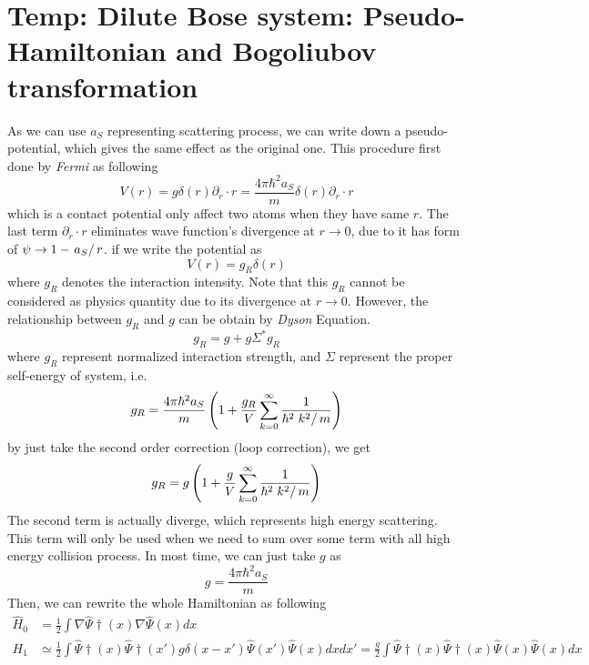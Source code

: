 \section{Temp: Dilute Bose system: Pseudo-Hamiltonian and Bogoliubov transformation}
As we can use $a_S$ representing scattering process, we can write down a pseudo-potential, which gives the same effect as the original one. This procedure first done by \textit{Fermi} as following
\begin{equation}
V(r)=g \delta (r)\partial _r\cdot r=\frac{4\pi\hbar^2a_S}{m}\delta (r)\partial _r\cdot r
\end{equation}
which is a contact potential only affect two atoms when they have same $r$. The last term $\partial _r\cdot r$ eliminates wave function's divergence at $r\to 0$, due to it has form of $\psi \to 1-\left.a_S\right/r$. if we write the potential as
\begin{equation}
V(r)=g_R\delta (r)
\end{equation}
where $g_R$ denotes the interaction intensity. Note that this $g_R$ cannot be considered as physics quantity due to its divergence at $r\to 0$. However, the relationship between $g_R$ and $g$ can be obtain by \textit{Dyson} Equation.
\begin{equation}
g_R=g+g \Sigma ^* g_R
\end{equation}
where $g_R$ represent normalized interaction strength, and $\Sigma$ represent the proper self-energy of system, i.e.
\begin{equation}
g_R=\frac{4\pi  \hbar ^2a_S}{m}\left(1+\frac{g_R}{V}\sum _{k=0}^{\infty } \frac{1}{\hbar ^2\left.k^2\right/m}\right)
\end{equation}
by just take the second order correction (loop correction), we get
\begin{equation}
g_R=g\left(1+\frac{g}{V}\sum _{k=0}^{\infty } \frac{1}{\hbar ^2\left.k^2\right/m}\right)
\end{equation}
The second term is actually diverge, which represents high energy scattering. This term will only be used when we need to sum over some term with all high energy collision process. In most time, we can just take $g$ as
\begin{equation}
g=\frac{4\pi  \hbar ^2a_S}{m}
\end{equation}
Then, we can rewrite the whole Hamiltonian as following
\begin{equation}
\begin{split}
\hat{H}_0&=\frac{1}{2}\int \nabla \hat{\Psi }\dagger(x)\nabla \hat{\Psi }(x)dx\\
H_1&\simeq \frac{1}{2}\int \hat{\Psi }\dagger(x)\hat{\Psi }\dagger(x')g \delta (x-x')\hat{\Psi }(x')\hat{\Psi }(x)dxdx'=\frac{g}{2}\int \hat{\Psi}\dagger(x)\hat{\Psi }\dagger(x)\hat{\Psi }(x)\hat{\Psi }(x)dx
\end{split}
\end{equation}
